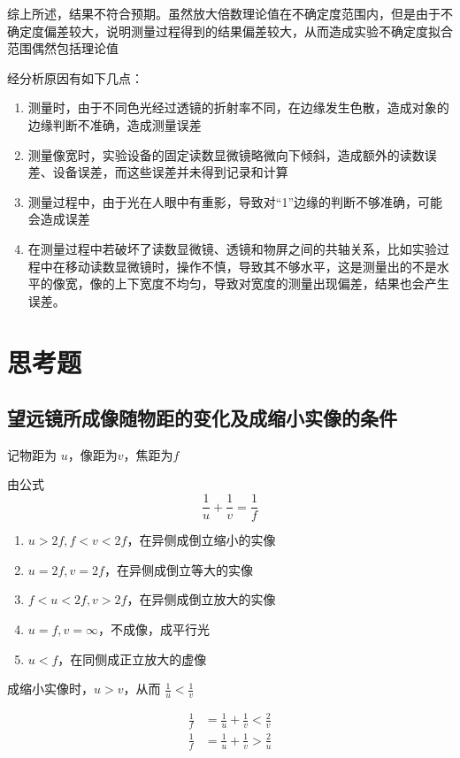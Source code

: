 \documentclass[UTF8]{ctexart}
\begin{document}
综上所述，结果不符合预期。虽然放大倍数理论值在不确定度范围内，但是由于不确定度偏差较大，说明测量过程得到的结果偏差较大，从而造成实验不确定度拟合范围偶然包括理论值

经分析原因有如下几点：
\begin{enumerate}
    \item 测量时，由于不同色光经过透镜的折射率不同，在边缘发生色散，造成对象的边缘判断不准确，造成测量误差
    \item 测量像宽时，实验设备的固定读数显微镜略微向下倾斜，造成额外的读数误差、设备误差，而这些误差并未得到记录和计算
    \item 测量过程中，由于光在人眼中有重影，导致对“1”边缘的判断不够准确，可能会造成误差
    \item 在测量过程中若破坏了读数显微镜、透镜和物屏之间的共轴关系，比如实验过程中在移动读数显微镜时，操作不慎，导致其不够水平，这是测量出的不是水平的像宽，像的上下宽度不均匀，导致对宽度的测量出现偏差，结果也会产生误差。
\end{enumerate}


\newpage

\section{思考题}
\subsection{望远镜所成像随物距的变化及成缩小实像的条件}
记物距为 $u$，像距为$v$，焦距为$f$

由公式 $$\frac{1}{u} + \frac{1}{v} = \frac{1}{f}$$
\begin{enumerate}
    \item $u > 2f,f< v < 2f$，在异侧成倒立缩小的实像
    \item $u = 2f, v = 2f$，在异侧成倒立等大的实像
    \item $f < u < 2f, v > 2f$，在异侧成倒立放大的实像
    \item $u = f,v = \infty $，不成像，成平行光
    \item $u < f$，在同侧成正立放大的虚像
\end{enumerate}

成缩小实像时，$u > v$，从而 $\frac{1}{u} < \frac{1}{v}$

\begin{align*}
    \frac{1}{f} &= \frac{1}{u} + \frac{1}{v} < \frac{2}{v}  \\
    \frac{1}{f} &= \frac{1}{u} + \frac{1}{v} > \frac{2}{u}
\end{align*}
\end{document}
